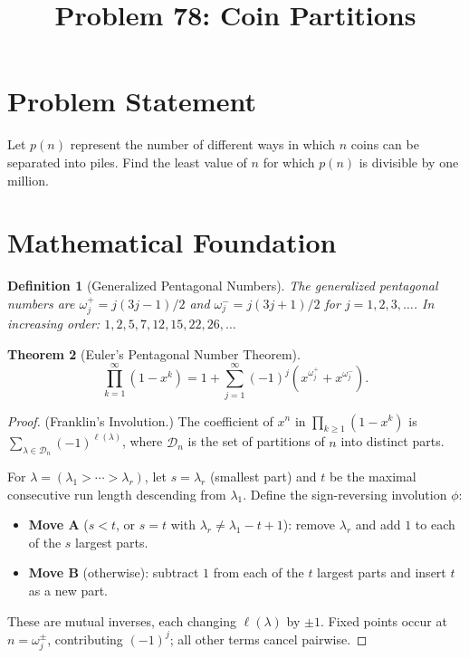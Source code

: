 \documentclass[11pt]{article}
\title{Problem 78: Coin Partitions}
\author{}
\date{}
\newtheorem{theorem}{Theorem}
\newtheorem{definition}[theorem]{Definition}
\begin{document}
\maketitle

\section{Problem Statement}

Let $p(n)$ represent the number of different ways in which $n$ coins can be separated into piles. Find the least value of $n$ for which $p(n)$ is divisible by one million.

\section{Mathematical Foundation}

\begin{definition}[Generalized Pentagonal Numbers]
The \emph{generalized pentagonal numbers} are $\omega_j^{+} = j(3j-1)/2$ and $\omega_j^{-} = j(3j+1)/2$ for $j = 1, 2, 3, \ldots$. In increasing order: $1, 2, 5, 7, 12, 15, 22, 26, \ldots$
\end{definition}

\begin{theorem}[Euler's Pentagonal Number Theorem]
\[
\prod_{k=1}^{\infty}(1 - x^k) = 1 + \sum_{j=1}^{\infty} (-1)^j \left(x^{\omega_j^{+}} + x^{\omega_j^{-}}\right).
\]
\end{theorem}

\begin{proof}
(Franklin's Involution.) The coefficient of $x^n$ in $\prod_{k \geq 1}(1-x^k)$ is $\sum_{\lambda \in \mathcal{D}_n} (-1)^{\ell(\lambda)}$, where $\mathcal{D}_n$ is the set of partitions of $n$ into distinct parts.

For $\lambda = (\lambda_1 > \cdots > \lambda_r)$, let $s = \lambda_r$ (smallest part) and $t$ be the maximal consecutive run length descending from $\lambda_1$. Define the sign-reversing involution $\phi$:
\begin{itemize}
    \item \textbf{Move A} ($s < t$, or $s = t$ with $\lambda_r \neq \lambda_1 - t + 1$): remove $\lambda_r$ and add $1$ to each of the $s$ largest parts.
    \item \textbf{Move B} (otherwise): subtract $1$ from each of the $t$ largest parts and insert $t$ as a new part.
\end{itemize}
These are mutual inverses, each changing $\ell(\lambda)$ by $\pm 1$. Fixed points occur at $n = \omega_j^{\pm}$, contributing $(-1)^j$; all other terms cancel pairwise.
\end{proof}
\end{document}
